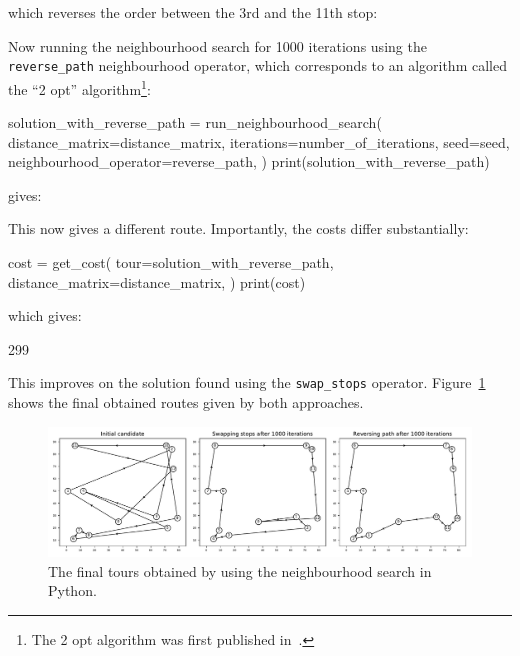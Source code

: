 which reverses the order between the 3rd and the 11th stop:

\begin{pyout}
[0, 7, 4, 10, 8, 2, 9, 3, 11, 5, 12, 1, 6, 0]
\end{pyout}

Now running the neighbourhood search for 1000 iterations using the
\texttt{reverse_path} neighbourhood operator, which corresponds to
an algorithm called the ``2 opt'' algorithm\footnote{The 2 opt algorithm was
first published in~\cite{croes1958method}.
}:

\begin{pyin}
solution_with_reverse_path = run_neighbourhood_search(
    distance_matrix=distance_matrix,
    iterations=number_of_iterations,
    seed=seed,
    neighbourhood_operator=reverse_path,
)
print(solution_with_reverse_path)
\end{pyin}

gives:

\begin{pyout}
[0, 8, 5, 3, 1, 9, 12, 11, 4, 10, 6, 2, 7, 0]
\end{pyout}

This now gives a different route.
Importantly, the costs differ substantially:

\begin{pyin}
cost = get_cost(
    tour=solution_with_reverse_path,
    distance_matrix=distance_matrix,
)
print(cost)
\end{pyin}

which gives:

\begin{pyout}
299
\end{pyout}

This improves on the solution found using the \texttt{swap_stops}
operator. Figure~\ref{fig:final-tsp-tours-python} shows the final obtained
routes given by both approaches.

\begin{figure}
    \begin{center}
        \includegraphics[width=\textwidth]{./assets/final-tsp-tours-with-python/main.pdf}
    \end{center}
    \caption{The final tours obtained by using the neighbourhood search in
    Python.}
    \label{fig:final-tsp-tours-python}
\end{figure}



